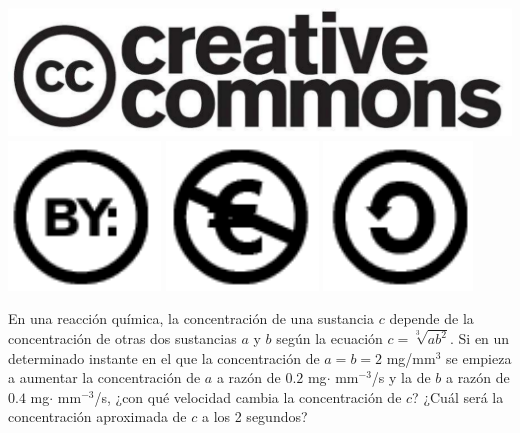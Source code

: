 \documentclass[aspectratio=149,10pt,xcolor=dvipsnames,t]{beamer}
\begin{document}
\begin{frame}[c]
\begin{center}
\biskip
\includegraphics[scale=0.07]{img/cc-logo}
\includegraphics[scale=0.2]{img/cc-by}
\includegraphics[scale=0.2]{img/cc-e}
\includegraphics[scale=0.2]{img/cc-c}
\end{center}
\end{frame}

\begin{frame}[c]
\Large
En una reacción química, la concentración de una sustancia $c$ depende de la concentración de otras dos sustancias $a$ y $b$
según la ecuación $c=\sqrt[3]{ab^2}$. 
Si en un determinado instante en el que la concentración de $a=b=2$ mg/mm$^3$ se empieza a aumentar la concentración de $a$ a razón de $0.2$ mg$\cdot$ mm$^{-3}$/s y la de $b$ a razón de $0.4$ mg$\cdot$ mm$^{-3}$/s, ¿con qué velocidad cambia la
concentración de $c$? 
¿Cuál será la concentración aproximada de $c$ a los 2 segundos?
\end{frame}
\end{document}
